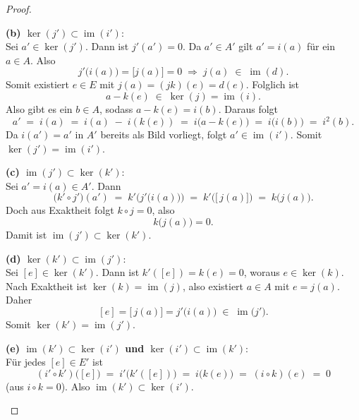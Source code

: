 \documentclass[12pt]{article}
\numberwithin{conj}{section}
\newcommand{\ima}{\operatorname{im}}
\begin{document}
\begin{proof}
\begin{enumerate}[nolistsep]
              \textbf{(b) $\ker(j') \subset \ima(i')$}:\\
              Sei $a' \in \ker(j')$. Dann ist $j'(a') = 0$. Da $a' \in A'$ gilt $a' = i(a)$ für ein $a \in A$. Also
              \[
                j'\bigl(i(a)\bigr) = \bigl[j(a)\bigr] = 0 
                \;\Longrightarrow\;
                j(a) \;\in\; \ima(d).
              \]
              Somit existiert $e \in E$ mit $j(a) = (jk)(e) = d(e)$. Folglich ist
              \[
                a - k(e) \;\in\; \ker(j) = \ima(i).
              \]
              Also gibt es ein $b \in A$, sodass $a - k(e) = i(b)$. Daraus folgt
              \[
                a' \;=\; i(a)
                \;=\; i(a) \;-\; i(k(e)) \;=\; i\bigl(a - k(e)\bigr)
                \;=\; i\bigl(i(b)\bigr)
                \;=\; i^2(b).
              \]
              Da $i(a') = a'$ in $A'$ bereits als Bild vorliegt, folgt $a' \in \ima(i')$. Somit $\ker(j') = \ima(i')$.
              
              \textbf{(c) $\ima(j') \subset \ker(k')$}:\\
              Sei $a' = i(a) \in A'$. Dann
              \[
                \bigl(k' \circ j'\bigr)(a')
                \;=\;
                k'\bigl(j'\bigl(i(a)\bigr)\bigr)
                \;=\;
                k'\bigl([\,j(a)\bigr])
                \;=\;
                k\bigl(j(a)\bigr).
              \]
              Doch aus Exaktheit folgt $k \circ j = 0$, also
              \[
                k\bigl(j(a)\bigr) = 0.
              \]
              Damit ist $\ima(j') \subset \ker(k')$.
              
              \textbf{(d) $\ker(k') \subset \ima(j')$}:\\
              Sei $[e] \in \ker(k')$. Dann ist $k'( [e] ) = k(e) = 0$, woraus $e \in \ker(k)$. Nach Exaktheit ist $\ker(k) = \ima(j)$, also existiert $a \in A$ mit $e = j(a)$. Daher
              \[
                [e] = [\,j(a)\bigr] = j'\bigl(i(a)\bigr) \;\in\; \ima\bigl(j'\bigr).
              \]
              Somit $\ker(k') = \ima(j')$.
              
              \textbf{(e) $\ima(k') \subset \ker(i')$ und $\ker(i') \subset \ima(k')$}:\\
              Für jedes $[e] \in E'$ ist
              \[
                (i' \circ k')\bigl([e]\bigr)
                \;=\;
                i'\bigl(k'( [e] )\bigr)
                \;=\;
                i\bigl(k(e)\bigr)
                \;=\;
                (i \circ k)(e)
                \;=\;
                0
              \]
              (aus $i \circ k = 0$). Also $\ima(k') \subset \ker(i')$.
              

\end{enumerate}
\end{proof}
\end{document}
